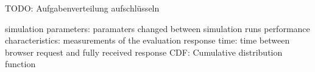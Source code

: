 \documentclass[
10pt, %
a4paper, %
oneside, %
headinclude,footinclude, %
BCOR5mm, %
]{scrartcl}
\begin{document}
TODO: Aufgabenverteilung aufschlüsseln

simulation parameters: paramaters changed between simulation runs
performance characteristics: measurements of the evaluation
response time: time between browser request and fully received response
CDF: Cumulative distribution function
\listoffigures %

\listoftables %



\renewcommand{\refname}{\spacedlowsmallcaps{References}} %




\end{document}
